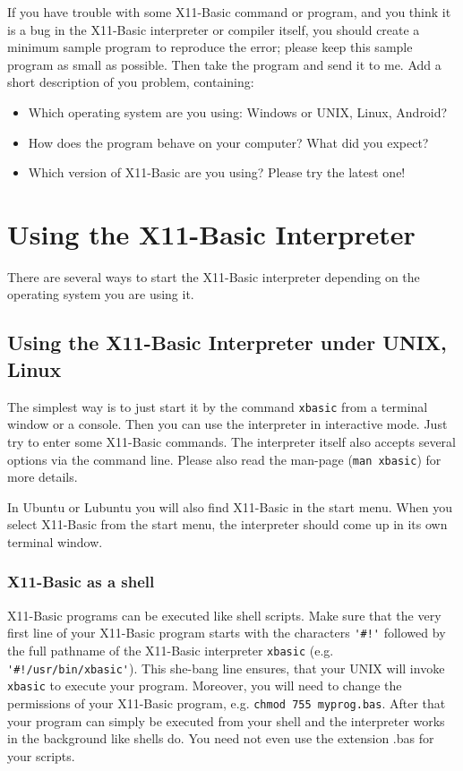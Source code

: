 If you have trouble with some X11-Basic command or program, and you think it is
a bug in the X11-Basic interpreter or compiler itself, you should create  a
minimum sample program to reproduce the error; please keep this sample  program
as small as possible. Then take the program and send it to me. Add a short
description of you problem, containing:  
\begin{itemize} 
  \item Which operating system are you using: Windows or UNIX, Linux, Android?  
  \item How does the program behave on your computer? What did you expect?  
  \item Which version of X11-Basic are you using? Please try the latest one! 
\end{itemize}

\section{Using the X11-Basic Interpreter}

There are several ways to start the X11-Basic interpreter depending on the
operating system you are using it.

\subsection{Using the X11-Basic Interpreter under UNIX, Linux}

The simplest way is to just start it by the command \verb|xbasic| from a
terminal window or a console. Then you can use the interpreter in interactive
mode. Just try to enter some X11-Basic commands. The interpreter itself also
accepts several options via the command line. Please also read the man-page
(\verb|man xbasic|) for more details.

In Ubuntu or Lubuntu you will also find X11-Basic in the start menu. When you
select  X11-Basic from the start menu, the interpreter should come up in its own
terminal window. 

\subsubsection{X11-Basic as a shell}

X11-Basic programs can be executed like shell scripts. Make sure that the very
first line of your X11-Basic program  starts with the characters \verb|'#!'|
followed by the full pathname of the X11-Basic interpreter \verb|xbasic| (e.g.
\verb|'#!/usr/bin/xbasic'|).  This she-bang line ensures, that your UNIX will
invoke \verb|xbasic| to  execute your program. Moreover, you will need to change the
permissions of your X11-Basic program, e.g. \verb|chmod 755 myprog.bas|.  After
that your program can simply be executed from your shell and the interpreter
works in the background like shells do. You need not even use the extension .bas
for your scripts.


